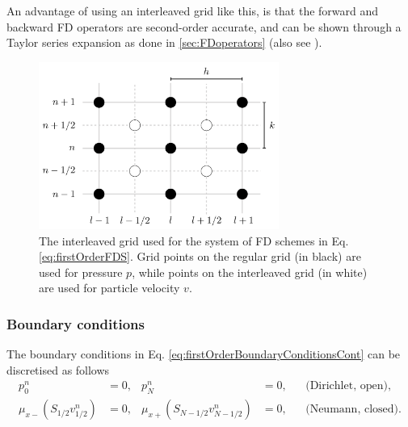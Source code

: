{An advantage of using an interleaved grid like this, is that the forward and backward FD operators are second-order accurate, and can be shown through a Taylor series expansion as done in \ref{sec:FDoperators} (also see \cite{Harrison2018}).

\begin{figure}
    \centering
    \includegraphics[width=0.7\textwidth]{figures/resonators/brass/interleavedGridFigure.pdf}
    \caption{The interleaved grid used for the system of FD schemes in Eq. \eqref{eq:firstOrderFDS}. Grid points on the regular grid (in black) are used for pressure $p$, while points on the interleaved grid (in white) are used for particle velocity $v$.\label{fig:interleavedGrid}}
\end{figure}

\subsubsection{Boundary conditions}\label{sec:boundariesFirstOrder}
The boundary conditions in Eq. \eqref{eq:firstOrderBoundaryConditionsCont} can be discretised as follows
\begin{subequations}
    \begin{align}\label{eq:firstOrderBoundaryConditions}
        p_0^n &= 0, & p_N^n &= 0, & &\text{(Dirichlet, open),}\\
        \mu_{x-}(S_{1/2}v_{1/2}^n) &= 0, & \mu_{x+}(S_{N-1/2}v_{N-1/2}^n) &= 0, & &\text{(Neumann, closed)}.
    \end{align}
\end{subequations}
}
